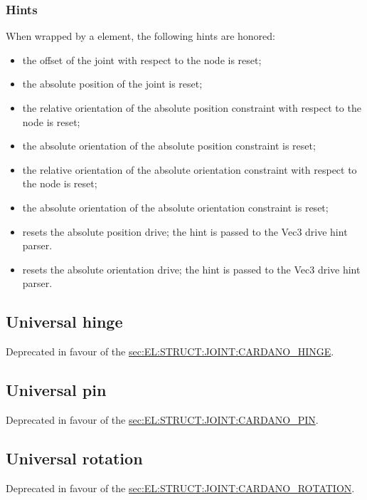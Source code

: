 \subsubsection{Hints}
When wrapped by a  element, the following hints are honored:
\begin{itemize}
\item {} the offset of the joint
with respect to the node is reset;
\item {} the absolute position of the joint
is reset;
\item {} the relative orientation
of the absolute position constraint with respect to the node is reset;
\item {} the absolute orientation 
of the absolute position constraint is reset;
\item {} the relative orientation
of the absolute orientation constraint with respect to the node is reset;
\item {} the absolute orientation 
of the absolute orientation constraint is reset;
\item {} resets the absolute position drive;
the hint is passed to the Vec3 drive hint parser.
\item {} resets the absolute orientation drive;
the hint is passed to the Vec3 drive hint parser.
\end{itemize}




\subsection{Universal hinge}
\label{sec:EL:STRUCT:JOINT:UNIVERSAL_HINGE}
Deprecated in favour of the
\hyperref{\kw{cardano hinge}}{\kw{cardano hinge} (see Section~}{)}{sec:EL:STRUCT:JOINT:CARDANO_HINGE}.



\subsection{Universal pin}
\label{sec:EL:STRUCT:JOINT:UNIVERSAL_PIN}
Deprecated in favour of the
\hyperref{\kw{cardano pin}}{\kw{cardano pin} (see Section~}{)}{sec:EL:STRUCT:JOINT:CARDANO_PIN}.



\subsection{Universal rotation}
\label{sec:EL:STRUCT:JOINT:UNIVERSAL_ROTATION}
Deprecated in favour of the
\hyperref{\kw{cardano rotation}}{\kw{cardano rotation} (see Section~}{)}{sec:EL:STRUCT:JOINT:CARDANO_ROTATION}.



